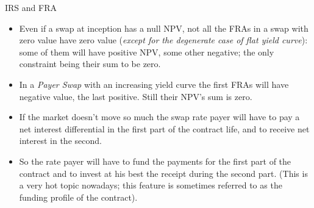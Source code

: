 \documentclass{beamer}
\begin{document}
\begin{frame}{IRS and FRA}
	\begin{itemize}
		\item<1-> Even if a swap at inception has a null NPV, not all the FRAs in a swap with zero value have zero value (\emph{except for the degenerate case of flat yield curve}): some of them will have positive NPV, some other negative; the only constraint being their sum to be zero.
		\item<2-> In a \emph{Payer Swap} with an increasing yield curve the first FRAs will have negative value, the last positive. Still their NPV's sum is zero.
		\item<3-> If the market doesn't move so much the swap rate payer will have to pay a net interest differential in the first part of the contract life, and to receive net interest in the second.
		\item<4-> So the rate payer will have to fund the payments for the first part of the contract and to invest at his best the receipt during the second part. (This is a very hot topic nowadays; this feature is sometimes referred to as the funding profile of the contract).
	\end{itemize}
\end{frame}
\end{document}
